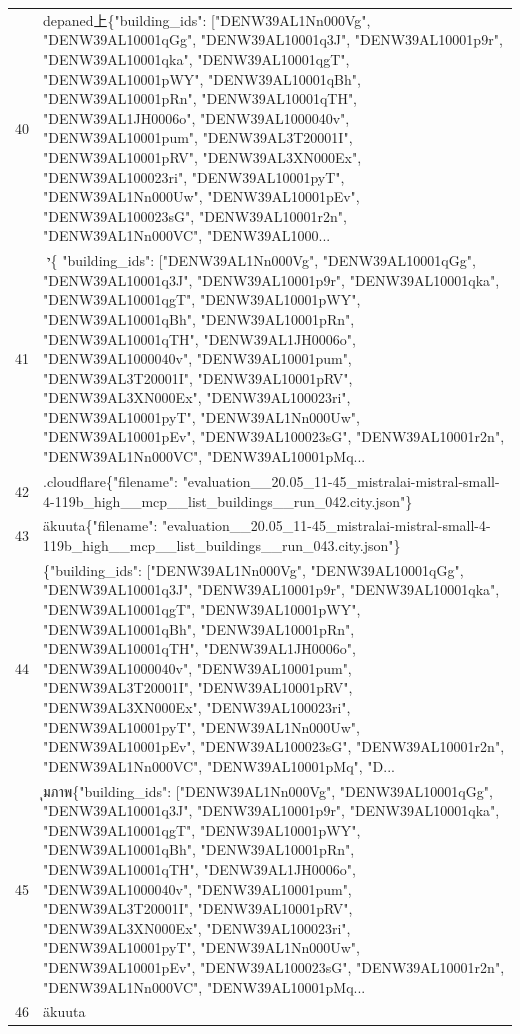 \documentclass[a4paper,11pt]{article}
\begin{document}
\begin{table}[ht]
\begin{tabular}{r p{12cm}}
40 &  depaned上\{"building\_ids": ["DENW39AL1Nn000Vg", "DENW39AL10001qGg", "DENW39AL10001q3J", "DENW39AL10001p9r", "DENW39AL10001qka", "DENW39AL10001qgT", "DENW39AL10001pWY", "DENW39AL10001qBh", "DENW39AL10001pRn", "DENW39AL10001qTH", "DENW39AL1JH0006o", "DENW39AL1000040v", "DENW39AL10001pum", "DENW39AL3T20001I", "DENW39AL10001pRV", "DENW39AL3XN000Ex", "DENW39AL100023ri", "DENW39AL10001pyT", "DENW39AL1Nn000Uw", "DENW39AL10001pEv", "DENW39AL100023sG", "DENW39AL10001r2n", "DENW39AL1Nn000VC", "DENW39AL1000... \\
41 & י׬\{
  "building\_ids": ["DENW39AL1Nn000Vg", "DENW39AL10001qGg", "DENW39AL10001q3J", "DENW39AL10001p9r", "DENW39AL10001qka", "DENW39AL10001qgT", "DENW39AL10001pWY", "DENW39AL10001qBh", "DENW39AL10001pRn", "DENW39AL10001qTH", "DENW39AL1JH0006o", "DENW39AL1000040v", "DENW39AL10001pum", "DENW39AL3T20001I", "DENW39AL10001pRV", "DENW39AL3XN000Ex", "DENW39AL100023ri", "DENW39AL10001pyT", "DENW39AL1Nn000Uw", "DENW39AL10001pEv", "DENW39AL100023sG", "DENW39AL10001r2n", "DENW39AL1Nn000VC", "DENW39AL10001pMq... \\
42 & .cloudflare\{"filename": "evaluation\_\_20.05\_11-45\_mistralai-mistral-small-4-119b\_high\_\_mcp\_\_list\_buildings\_\_run\_042.city.json"\} \\
43 & äkuuta\{"filename": "evaluation\_\_20.05\_11-45\_mistralai-mistral-small-4-119b\_high\_\_mcp\_\_list\_buildings\_\_run\_043.city.json"\} \\
44 & \{"building\_ids": ["DENW39AL1Nn000Vg", "DENW39AL10001qGg", "DENW39AL10001q3J", "DENW39AL10001p9r", "DENW39AL10001qka", "DENW39AL10001qgT", "DENW39AL10001pWY", "DENW39AL10001qBh", "DENW39AL10001pRn", "DENW39AL10001qTH", "DENW39AL1JH0006o", "DENW39AL1000040v", "DENW39AL10001pum", "DENW39AL3T20001I", "DENW39AL10001pRV", "DENW39AL3XN000Ex", "DENW39AL100023ri", "DENW39AL10001pyT", "DENW39AL1Nn000Uw", "DENW39AL10001pEv", "DENW39AL100023sG", "DENW39AL10001r2n", "DENW39AL1Nn000VC", "DENW39AL10001pMq", "D... \\
45 & ุมภาพ\{"building\_ids": ["DENW39AL1Nn000Vg", "DENW39AL10001qGg", "DENW39AL10001q3J", "DENW39AL10001p9r", "DENW39AL10001qka", "DENW39AL10001qgT", "DENW39AL10001pWY", "DENW39AL10001qBh", "DENW39AL10001pRn", "DENW39AL10001qTH", "DENW39AL1JH0006o", "DENW39AL1000040v", "DENW39AL10001pum", "DENW39AL3T20001I", "DENW39AL10001pRV", "DENW39AL3XN000Ex", "DENW39AL100023ri", "DENW39AL10001pyT", "DENW39AL1Nn000Uw", "DENW39AL10001pEv", "DENW39AL100023sG", "DENW39AL10001r2n", "DENW39AL1Nn000VC", "DENW39AL10001pMq... \\
46 & äkuuta

\end{tabular}
\end{table}
\end{document}
